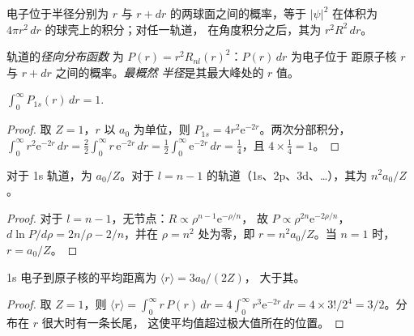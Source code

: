 电子位于半径分别为 $r$ 与 $r +
dr$ 的两球面之间的概率，等于 $|\psi|^2$ 在体积为 $4\pi r^2\,dr$ 的球壳上的积分；对任一轨道，
在角度积分之后，其为 $r^2R^2\,dr$。

\begin{definition}[径向分布]\label{def:b2:atomic-orbitals:radial-distribution}
轨道的\emph{径向分布函数}
为 $P(r) = r^2R_{nl}(r)^2$：$P(r)\,dr$ 为电子位于
距原子核 $r$ 与 $r + dr$ 之间的概率。\emph{最概然
半径}是其最大峰处的 $r$ 值。
\end{definition}

\begin{proposition}[1s 的归一化]\label{prop:b2:atomic-orbitals:normalised}
$\int_0^\infty P_{1s}(r)\,dr = 1$.
\end{proposition}

\begin{proof}
取 $Z = 1$，$r$ 以 $a_0$ 为单位，则 $P_{1s} = 4r^2\mathrm e^{-2r}$。两次分部积分，
$\int_0^\infty r^2\mathrm e^{-2r}\,dr = \frac22\int_0^\infty r\,\mathrm e^{-2r}\,dr =
\frac12\int_0^\infty\mathrm e^{-2r}\,dr = \frac14$，且 $4 \times \frac14 = 1$。
\end{proof}

\begin{proposition}[最概然半径]\label{prop:b2:atomic-orbitals:most-probable}
对于 1s 轨道，为 $a_0/Z$。对于 $l =
n - 1$ 的轨道（1s、2p、3d、\dots），其为 $n^2a_0/Z$。
\end{proposition}

\begin{proof}
对于 $l = n - 1$，无节点：$R \propto \rho^{n-1}\mathrm e^{-\rho/n}$，
故 $P \propto \rho^{2n}\mathrm e^{-2\rho/n}$，$d\ln P/d\rho = 2n/\rho - 2/n$，并在
$\rho = n^2$ 处为零，即 $r = n^2a_0/Z$。当 $n = 1$ 时，$r = a_0/Z$。
\end{proof}

\begin{proposition}[1s 电子的平均半径]\label{prop:b2:atomic-orbitals:mean-radius}
1s 电子到原子核的平均距离为 $\langle r\rangle = 3a_0/(2Z)$，
大于其。
\end{proposition}

\begin{proof}
取 $Z = 1$，则 $\langle r\rangle = \int_0^\infty r\,P(r)\,dr = 4\int_0^\infty r^3\mathrm e^{-2r}
\,dr = 4 \times 3!/2^4 = 3/2$。分布在 $r$ 很大时有一条长尾，
这使平均值超过极大值所在的位置。
\end{proof}

